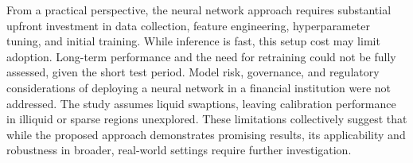 From a practical perspective, the neural network approach requires substantial upfront investment in data collection, feature engineering, hyperparameter tuning, and initial training. While inference is fast, this setup cost may limit adoption. Long-term performance and the need for retraining could not be fully assessed, given the short test period. Model risk, governance, and regulatory considerations of deploying a neural network in a financial institution were not addressed. The study assumes liquid swaptions, leaving calibration performance in illiquid or sparse regions unexplored. These limitations collectively suggest that while the proposed approach demonstrates promising results, its applicability and robustness in broader, real-world settings require further investigation.
